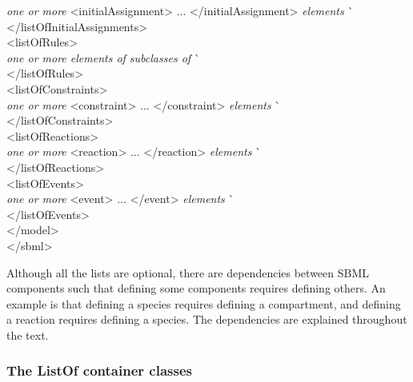 \begin{tt}
\begin{tabbing}
\>\>\>\textrm{\emph{one or more}} <initialAssignment> ... </initialAssignment> \textrm{\emph{elements}}  \` \sayOptional\\
\>\></listOfInitialAssignments>\\
\>\><listOfRules>\\
\>\>\>\textrm{\emph{one or more elements of subclasses of }}  \` \sayOptional\\
\>\></listOfRules>\\
\>\><listOfConstraints>\\
\>\>\>\textrm{\emph{one or more}} <constraint> ... </constraint> \textrm{\emph{elements}}  \` \sayOptional\\
\>\></listOfConstraints>\\
\>\><listOfReactions>\\
\>\>\>\textrm{\emph{one or more}} <reaction> ... </reaction> \textrm{\emph{elements}}  \` \sayOptional\\
\>\></listOfReactions>\\
\>\><listOfEvents>\\
\>\>\>\textrm{\emph{one or more}} <event> ... </event> \textrm{\emph{elements}}  \` \sayOptional\\
\>\></listOfEvents>\\
\></model>\\
</sbml>
\end{tabbing}
\regularspacing
\end{tt}
\vspace*{1ex}

Although all the lists are optional, there are dependencies
between SBML components such that defining some components
requires defining others.  An example is that defining a species
requires defining a compartment, and defining a reaction requires
defining a species.  The dependencies are explained throughout the
text.
  

\subsubsection{The ListOf container classes}
\label{sec:listof}
\label{sec:listofunitdefinitions}
\label{sec:listoffunctiondefinitions}
\label{sec:listofcompartmenttypes}
\label{sec:listofspeciestypes}
\label{sec:listofcompartments}
\label{sec:listofspecies}
\label{sec:listofparameters}
\label{sec:listofinitialassignments}
\label{sec:listofinitialassign}
\label{sec:listofrules}
\label{sec:listofconstraints}
\label{sec:listofreactions}
\label{sec:listofevents}

